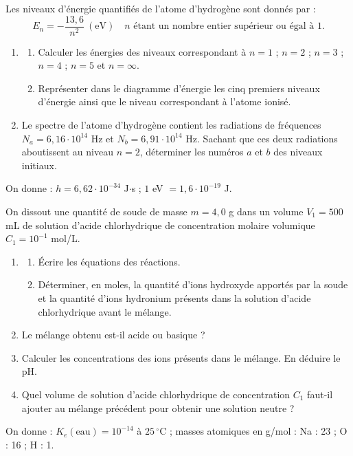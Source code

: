 \documentclass[11pt]{article}
\begin{document}


Les niveaux d'énergie quantifiés de l'atome d'hydrogène sont donnés par :
\[ E_n = -\frac{13{,}6}{n^2}\ (\text{eV}) \quad n \text{ étant un nombre entier supérieur ou égal à } 1. \]

\begin{enumerate}
  \item \begin{enumerate}[label=\alph*.]
    \item Calculer les énergies des niveaux correspondant à $n = 1$ ; $n = 2$ ; $n = 3$ ; $n = 4$ ; $n = 5$ et $n = \infty$.
    \item Représenter dans le diagramme d'énergie les cinq premiers niveaux d'énergie ainsi que le niveau correspondant à l'atome ionisé.
  \end{enumerate}
  \item Le spectre de l'atome d'hydrogène contient les radiations de fréquences $N_a = 6{,}16\cdot10^{14}$ Hz et $N_b = 6{,}91\cdot10^{14}$ Hz. Sachant que ces deux radiations aboutissent au niveau $n = 2$, déterminer les numéros $a$ et $b$ des niveaux initiaux.
\end{enumerate}
\noindent On donne : $h = 6{,}62\cdot10^{-34}$ J$\cdot$s ; $1$ eV $= 1{,}6\cdot10^{-19}$ J.

On dissout une quantité de soude de masse $m = 4{,}0$ g dans un volume $V_1 = 500$ mL de solution d'acide chlorhydrique de concentration molaire volumique $C_1 = 10^{-1}$ mol/L.

\begin{enumerate}
  \item \begin{enumerate}[label=\alph*.]
    \item Écrire les équations des réactions.
    \item Déterminer, en moles, la quantité d'ions hydroxyde apportés par la soude et la quantité d'ions hydronium présents dans la solution d'acide chlorhydrique avant le mélange.
  \end{enumerate}
  \item Le mélange obtenu est-il acide ou basique ?
  \item Calculer les concentrations des ions présents dans le mélange. En déduire le pH.
  \item Quel volume de solution d'acide chlorhydrique de concentration $C_1$ faut-il ajouter au mélange précédent pour obtenir une solution neutre ?
\end{enumerate}
\noindent On donne : $K_e(\text{eau}) = 10^{-14}$ à $25\,^\circ$C ; masses atomiques en g/mol : Na : 23 ; O : 16 ; H : 1.
\end{document}
